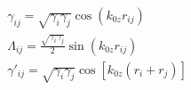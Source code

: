 \begin{equation}
\label{eq2}
\begin{split}
& \gamma_{ij}=\sqrt{\gamma_{i}\gamma_{j}}\cos(k_{0z}r_{ij}) \\
& \Lambda_{ij}=\frac{\sqrt{\gamma_{i}\gamma_{j}}}{2}\sin(k_{0z}r_{ij})\\
& \gamma'_{ij}=\sqrt{\gamma_{i}\gamma_{j}}\cos[k_{0z}(r_{i}+r_{j})]
\end{split}
\end{equation}